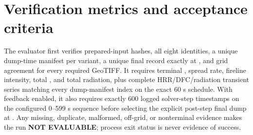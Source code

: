 \section{Verification metrics and acceptance criteria}
The evaluator first verifies prepared-input hashes, all eight identities, a
unique dump-time manifest per variant, a unique final record exactly at
\StopTime{}, and grid agreement for every required GeoTIFF.  It requires
 terminal \TOA{}, spread rate, fireline intensity, total \DFC{}, and total
 radiation, plus complete HRR/DFC/radiation transient series matching every
 dump-manifest index on the exact 60 s schedule.  With feedback enabled, it
 also requires exactly 600 logged solver-step timestamps on the configured
 0--599 s sequence before selecting the explicit post-step final dump at
 \StopTime{}.  Any missing,
duplicate, malformed, off-grid, or nonterminal evidence makes the run
\textbf{NOT EVALUABLE}; process exit status is never evidence of success.

